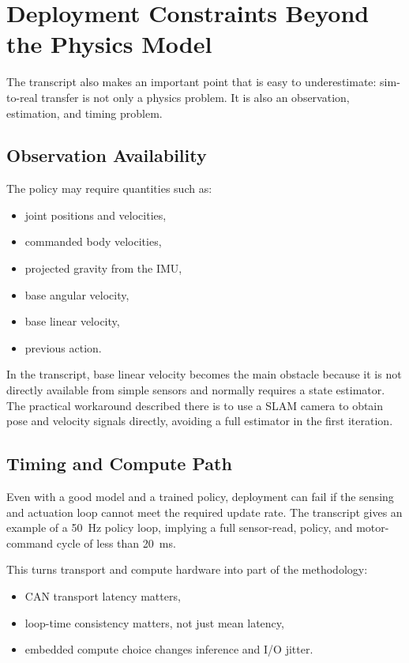 \documentclass[11pt,a4paper]{article}
\begin{document}
\section{Deployment Constraints Beyond the Physics Model}

The transcript also makes an important point that is easy to underestimate:
sim-to-real transfer is not only a physics problem.  It is also an
observation, estimation, and timing problem.

\subsection{Observation Availability}

The policy may require quantities such as:
\begin{itemize}[leftmargin=2em]
  \item joint positions and velocities,
  \item commanded body velocities,
  \item projected gravity from the IMU,
  \item base angular velocity,
  \item base linear velocity,
  \item previous action.
\end{itemize}

In the transcript, base linear velocity becomes the main obstacle because it is
not directly available from simple sensors and normally requires a state
estimator.  The practical workaround described there is to use a SLAM camera to
obtain pose and velocity signals directly, avoiding a full estimator in the
first iteration.

\subsection{Timing and Compute Path}

Even with a good model and a trained policy, deployment can fail if the sensing
and actuation loop cannot meet the required update rate.  The transcript gives
an example of a 50~Hz policy loop, implying a full sensor-read, policy, and
motor-command cycle of less than 20~ms.

This turns transport and compute hardware into part of the methodology:
\begin{itemize}[leftmargin=2em]
  \item CAN transport latency matters,
  \item loop-time consistency matters, not just mean latency,
  \item embedded compute choice changes inference and I/O jitter.
\end{itemize}
\end{document}
